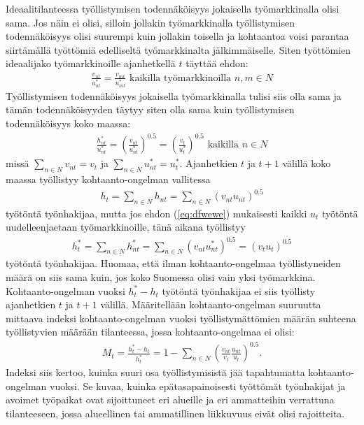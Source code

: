 \documentclass[12pt]{article}
\begin{document}
Ideaalitilanteessa työllistymisen todennäköisyys jokaisella työmarkkinalla olisi sama. Jos näin ei olisi, silloin jollakin työmarkkinalla työllistymisen todennäköisyys olisi suurempi kuin jollakin toisella ja kohtaantoa voisi parantaa siirtämällä työttömiä edelliseltä työmarkkinalta jälkimmäiselle. Siten työttömien ideaalijako työmarkkinoille ajanhetkellä $t$ täyttää ehdon:
\begin{align}
\frac{v_{nt}}{u_{nt}^*} = \frac{v_{mt}}{u_{mt}^*} \textrm{ kaikilla työmarkkinoilla } n, m \in N
\label{eq:dfwewe}
\end{align}
Työllistymisen todennäköisyys jokaisella työmarkkinalla tulisi siis olla sama ja tämän todennäköisyyden täytyy siten olla sama kuin työllistymisen todennäköisyys koko maassa:
\begin{align*}
\frac{h_{nt}^*}{u_{nt}^*} = \left ( \frac{v_{nt}}{u_{nt}^*} \right )^{0.5} = \left ( \frac{v_{t}}{u_{t}^*} \right )^{0.5} \textrm{ kaikilla } n \in N
\end{align*}
missä $\sum_{n\in N} v_{nt}=v_t$ ja $\sum_{n\in N} u_{nt}^*=u_t^*$. Ajanhetkien $t$ ja $t+1$ välillä koko maassa työllistyy kohtaanto-ongelman vallitessa
\begin{align}
h_t=\sum_{n\in N} h_{nt}=\sum_{n\in N}\left(v_{nt}u_{nt}\right)^{0.5}
\end{align}
työtöntä työnhakijaa, mutta jos ehdon (\ref{eq:dfwewe}) mukaisesti kaikki $u_t$ työtöntä uudelleenjaetaan työmarkkinoille, tänä aikana työllistyy
\begin{align}
h_t^*=\sum_{n\in N} h_{nt}^*=\sum_{n\in N}\left(v_{nt}u_{nt}^*\right)^{0.5}=\left(v_tu_t\right)^{0.5}
\end{align}
työtöntä työnhakijaa. Huomaa, että ilman kohtaanto-ongelmaa työllistyneiden määrä on siis sama kuin, jos koko Suomessa olisi vain yksi työmarkkina. Kohtaanto-ongelman vuoksi $h_t^*-h_t$ työtöntä työnhakijaa ei siis työllisty ajanhetkien $t$ ja $t+1$ välillä. Määritellään kohtaanto-ongelman suuruutta mittaava indeksi kohtaanto-ongelman vuoksi työllistymättömien määrän suhteena työllistyvien määrään tilanteessa, jossa kohtaanto-ongelmaa ei olisi:
\begin{align}
M_t=\frac{h_t^*-h_t}{h_t^*}=1-\sum_{n\in N}\left(\frac{v_{nt}}{v_t}\frac{u_{nt}}{u_t}\right)^{0.5}.
\end{align}
Indeksi siis kertoo, kuinka suuri osa työllistymisistä jää tapahtumatta kohtaanto-ongelman vuoksi. Se kuvaa, kuinka epätasapainoisesti työttömät työnhakijat ja avoimet työpaikat ovat sijoittuneet eri alueille ja eri ammatteihin verrattuna tilanteeseen, jossa alueellinen tai ammatillinen liikkuvuus eivät olisi rajoitteita. 
\end{document}
